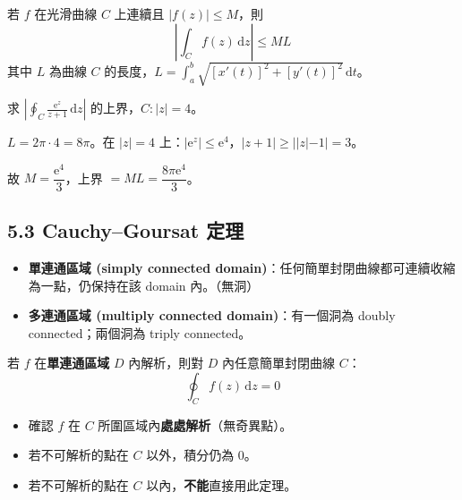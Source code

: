 \documentclass[12pt,a4paper]{article}
\newcommand{\dd}{\,\mathrm{d}}
\newcommand{\ee}{\mathrm{e}}
\begin{document}
\begin{theorembox}
若 $f$ 在光滑曲線 $C$ 上連續且 $|f(z)|\le M$，則
$$\left|\int_C f(z)\dd{z}\right|\le ML$$
其中 $L$ 為曲線 $C$ 的長度，$L=\displaystyle\int_a^b\sqrt{[x'(t)]^2+[y'(t)]^2}\dd{t}$。
\end{theorembox}

\begin{exbox}[ML 不等式範例]
求 $\displaystyle\left|\oint_C\frac{\ee^z}{z+1}\dd{z}\right|$ 的上界，$C:|z|=4$。

$L=2\pi\cdot4=8\pi$。在 $|z|=4$ 上：$|\ee^z|\le \ee^4$，$|z+1|\ge||z|-1|=3$。

故 $M=\dfrac{\ee^4}{3}$，上界 $=ML=\dfrac{8\pi\ee^4}{3}$。
\end{exbox}

\subsection{5.3 Cauchy--Goursat 定理}

\begin{defbox}[連通區域]
\begin{itemize}[nosep]
\item \textbf{單連通區域 (simply connected domain)}：任何簡單封閉曲線都可連續收縮為一點，仍保持在該 domain 內。（無洞）
\item \textbf{多連通區域 (multiply connected domain)}：有一個洞為 doubly connected；兩個洞為 triply connected。
\end{itemize}
\end{defbox}

\begin{theorembox}
若 $f$ 在\textbf{單連通區域} $D$ 內解析，則對 $D$ 內任意簡單封閉曲線 $C$：
$$\oint_C f(z)\dd{z}=0$$
\end{theorembox}

\begin{keybox}[判斷要點]
\begin{itemize}[nosep]
\item 確認 $f$ 在 $C$ 所圍區域內\textbf{處處解析}（無奇異點）。
\item 若不可解析的點在 $C$ 以外，積分仍為 $0$。
\item 若不可解析的點在 $C$ 以內，\textbf{不能}直接用此定理。
\end{itemize}
\end{keybox}
\end{document}
